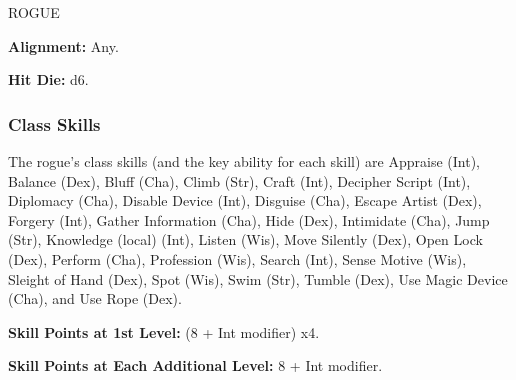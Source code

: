 \documentclass{article}
\begin{document}
\vspace{12pt}
{\LARGE{}ROGUE}

\textbf{Alignment:} Any.

\textbf{Hit Die:} d6.

\vspace{12pt}
\subsubsection*{\textbf{Class Skills}}

The rogue's class skills (and the key ability for each skill) are Appraise (Int), 
Balance (Dex), Bluff (Cha), Climb (Str), Craft (Int), Decipher Script (Int), Diplomacy 
(Cha), Disable Device (Int), Disguise (Cha), Escape Artist (Dex), Forgery (Int), 
Gather Information (Cha), Hide (Dex), Intimidate (Cha), Jump (Str), Knowledge (local) 
(Int), Listen (Wis), Move Silently (Dex), Open Lock (Dex), Perform (Cha), Profession 
(Wis), Search (Int), Sense Motive (Wis), Sleight of Hand (Dex), Spot (Wis), Swim 
(Str), Tumble (Dex), Use Magic Device (Cha), and Use Rope (Dex).

\textbf{Skill Points at 1st Level:} (8 + Int modifier) x$ $4.

\textbf{Skill Points at Each Additional Level:} 8 + Int modifier.
\end{document}
